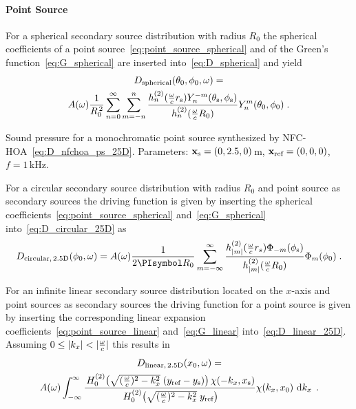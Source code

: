 \paragraph{Point Source}
%
For a spherical secondary source distribution with radius $R_0$ the spherical
coefficients of a point source~\eqref{eq:point_source_spherical} and of the Green's
function~\eqref{eq:G_spherical} are inserted into~\eqref{eq:D_spherical} and yield
%
%
\begin{multline}
    D_\text{spherical}(\theta_0,\phi_0,\omega) = \\
    A(\omega) \frac{1}{R_0^{\,2}} \sum_{n=0}^\infty \sum_{m=-n}^n
    \frac{h_n^{(2)}(\omegac r_\text{s}) Y_n^{-m}(\theta_\text{s},\phi_\text{s})}
    {h_n^{(2)}(\omegac R_0)} Y_n^m (\theta_0,\phi_0) \qp
    \label{eq:D_nfchoa_ps_3D}
\end{multline}
%
\begin{marginfigure}
    \centering
    \ft
    
    \caption{Sound pressure for a monochromatic point source synthesized by
        \twohalfD \ac{NFC-HOA}~\eqref{eq:D_nfchoa_ps_25D}. Parameters: $\mathbf{x}_\text{s} =
        (0,2.5,0)$\,m, $\mathbf{x}_\text{ref} = (0,0,0)$, $f = 1$\,kHz.
        }
\end{marginfigure}
%
For a circular secondary source distribution with radius $R_0$ and point source
as secondary sources the \twohalfD driving function is given by inserting the
spherical coefficients~\eqref{eq:point_source_spherical} and~\eqref{eq:G_spherical}
into~\eqref{eq:D_circular_25D} as
%
\begin{equation}
    D_{\text{circular},\,\twohalfD}(\phi_0,\omega) = A(\omega) \frac{1}{2\PI R_0}
        \sum_{m=-\infty}^{\infty}
        \frac{h_{|m|}^{(2)} (\omegac r_s) \Phi_{-m}(\phi_\text{s})} 
        {h_{|m|}^{(2)} (\omegac R_0)} \Phi_m(\phi_0) \qp
    \label{eq:D_nfchoa_ps_25D}
\end{equation}
%

For an infinite linear secondary source distribution located on the $x$-axis and
point sources as secondary sources the \twohalfD driving function for a
point source is given by inserting the corresponding linear expansion
coefficients~\eqref{eq:point_source_linear} and~\eqref{eq:G_linear}
into~\eqref{eq:D_linear_25D}. Assuming
$0 \le |k_x| < |\frac{\omega}{c}|$ this results
in\autocite[Compare (4.53) in][]{Ahrens2012}
%
\begin{multline}
    D_{\text{linear},\,\twohalfD}(x_0,\omega) = \\
    A(\omega) \int_{-\infty}^\infty \frac{
    \H{0}{2}\left(\sqrt{(\omegac)^2-k_x^2} \; (y_\text{ref}-y_\text{s}) \right)
    \chi(-k_x,x_\text{s})} {\H{0}{2}\left(\sqrt{(\omegac)^2-k_x^2} \;
    y_\text{ref}\right)} \chi(k_x,x_0) \, \D{k_x} \qp
    \label{eq:D_sdm_ps_25D}
\end{multline}
%


